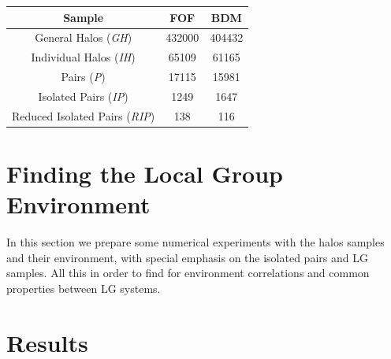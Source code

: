 \documentclass[usenatbib]{latex/mn2e}
\begin{document}
\begin{flushleft}
\begin{table}
\begin{center}

  \begin{tabular}{c c c} \hline
	\textbf{Sample}					&\textbf{FOF}&\textbf{BDM} \\ \hline
	General Halos (\textit{GH}) 	& 432000	 & 404432  \\ 
	Individual Halos (\textit{IH}) 	& 65109		 & 61165  \\ 
	Pairs (\textit{P}) 	 			& 17115		 & 15981  \\ 
	Isolated Pairs (\textit{IP})	& 1249		 & 1647  \\ 
	Reduced Isolated Pairs (\textit{RIP})& 138	 & 116  \\ \hline
  \end{tabular}
  
  
  \label{Tab:Samples_Size}
  
\end{center}
\end{table}
\end{flushleft}


\section{Finding the Local Group Environment}
\label{sec:LGEnvironment}



In this section we prepare some numerical experiments with the halos 
samples and their environment, with special emphasis on the isolated pairs 
and LG samples. All this in order to find for environment correlations and 
common properties between LG systems.



\section{Results}
\label{sec:Results}
\end{document}

